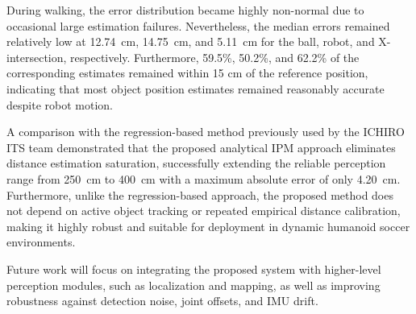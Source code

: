\documentclass[journal]{IAENGtran}
\begin{document}
During walking, the error distribution became highly non-normal due to
occasional large estimation failures. Nevertheless, the median errors
remained relatively low at 12.74~cm, 14.75~cm, and 5.11~cm for the
ball, robot, and X-intersection, respectively. Furthermore, 59.5\%,
50.2\%, and 62.2\% of the corresponding estimates remained within
15 cm of the reference position, indicating that most object position
estimates remained reasonably accurate despite robot motion.

A comparison with the regression-based method previously used by the ICHIRO ITS 
team demonstrated that the proposed analytical IPM approach eliminates distance 
estimation saturation, successfully extending the reliable perception range from 
250~cm to 400~cm with a maximum absolute error of only 4.20~cm. Furthermore, 
unlike the regression-based approach, the proposed method does not depend on active 
object tracking or repeated empirical distance calibration, making it highly robust 
and suitable for deployment in dynamic humanoid soccer environments.

Future work will focus on integrating the proposed system with higher-level perception
modules, such as localization and mapping, as well as improving robustness against
detection noise, joint offsets, and IMU drift.


\end{document}
